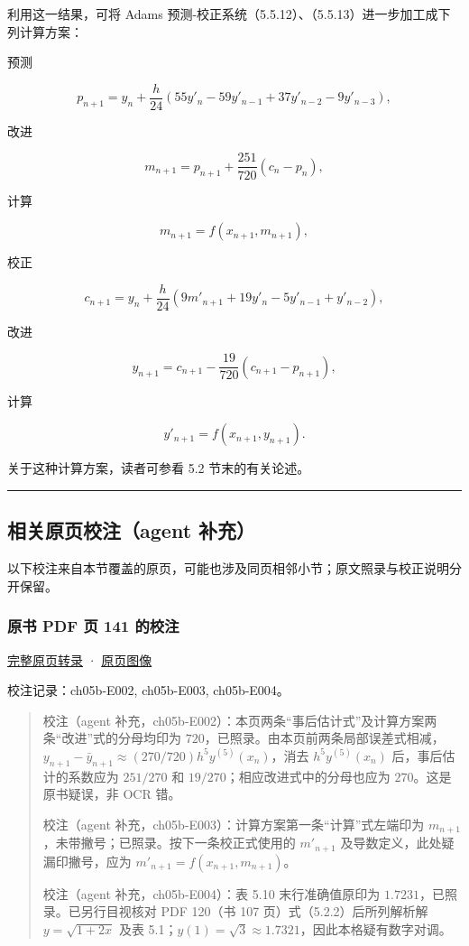 \documentclass[
  10pt,
  fontset=fandol]{ctexart}
\begin{document}
利用这一结果，可将 Adams 预测-校正系统（5.5.12）、（5.5.13）进一步加工成下列计算方案：

预测

\[
p_{n+1}=y_n+\frac h{24}(55y'_n-59y'_{n-1}+37y'_{n-2}-9y'_{n-3}),
\]

改进

\[
m_{n+1}=p_{n+1}+\frac{251}{720}(c_n-p_n),
\]

计算

\[
m_{n+1}=f(x_{n+1},m_{n+1}),
\]

校正

\[
c_{n+1}=y_n+\frac h{24}(9m'_{n+1}+19y'_n-5y'_{n-1}+y'_{n-2}),
\]

改进

\[
y_{n+1}=c_{n+1}-\frac{19}{720}(c_{n+1}-p_{n+1}),
\]

计算

\[
y'_{n+1}=f(x_{n+1},y_{n+1}).
\]

关于这种计算方案，读者可参看 5.2 节末的有关论述。

\begin{center}\rule{0.5\linewidth}{0.5pt}\end{center}

\subsection{相关原页校注（agent 补充）}\label{ux76f8ux5173ux539fux9875ux6821ux6ce8agent-ux8865ux5145}

以下校注来自本节覆盖的原页，可能也涉及同页相邻小节；原文照录与校正说明分开保留。

\subsubsection{原书 PDF 页 141 的校注}\label{ux539fux4e66-pdf-ux9875-141-ux7684ux6821ux6ce8}

\href{../pages/pdf-141.md}{完整原页转录} · \href{../../source-images/pdf-141.jpeg}{原页图像}

校注记录：ch05b-E002, ch05b-E003, ch05b-E004。

\begin{quote}
校注（agent 补充，ch05b-E002）：本页两条``事后估计式''及计算方案两条``改进''式的分母均印为 \(720\)，已照录。由本页前两条局部误差式相减，\(y_{n+1}-\bar y_{n+1}\approx(270/720)h^5y^{(5)}(x_n)\)，消去 \(h^5y^{(5)}(x_n)\) 后，事后估计的系数应为 \(251/270\) 和 \(19/270\)；相应改进式中的分母也应为 \(270\)。这是原书疑误，非 OCR 错。

校注（agent 补充，ch05b-E003）：计算方案第一条``计算''式左端印为 \(m_{n+1}\)，未带撇号；已照录。按下一条校正式使用的 \(m'_{n+1}\) 及导数定义，此处疑漏印撇号，应为 \(m'_{n+1}=f(x_{n+1},m_{n+1})\)。

校注（agent 补充，ch05b-E004）：表 5.10 末行准确值原印为 \(1.7231\)，已照录。已另行目视核对 PDF 120（书 107 页）式（5.2.2）后所列解析解 \(y=\sqrt{1+2x}\) 及表 5.1；\(y(1)=\sqrt3\approx1.7321\)，因此本格疑有数字对调。
\end{quote}
\end{document}

